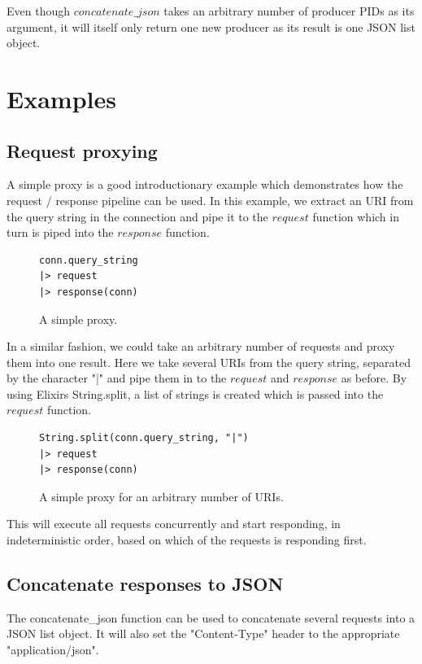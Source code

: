\documentclass{cslthse-msc}
\begin{document}
Even though $concatenate\_json$ takes an arbitrary number of producer PIDs as its argument, it will itself only return one new producer as its result is one JSON list object.


\section{Examples}
\subsection{Request proxying}
A simple proxy is a good introductionary example which demonstrates how the request / response pipeline can be used. In this example, we extract an URI from the query string in the connection and pipe it to the $request$ function which in turn is piped into the $response$ function.

\begin{figure}[H]
  \centering
\begin{lstlisting}[breaklines=true,frame=single]
conn.query_string
|> request
|> response(conn)
\end{lstlisting}
  \caption{A simple proxy.}
\end{figure}

In a similar fashion, we could take an arbitrary number of requests and proxy them into one result. Here we take several URIs from the query string, separated by the character "|" and pipe them in to the $request$ and $response$ as before. By using Elixirs String.split, a list of strings is created which is passed into the $request$ function.

\begin{figure}[H]
  \centering
\begin{lstlisting}[breaklines=true,frame=single]
String.split(conn.query_string, "|")
|> request
|> response(conn)
\end{lstlisting}
  \caption{A simple proxy for an arbitrary number of URIs.}
\end{figure}

This will execute all requests concurrently and start responding, in indeterministic order, based on which of the requests is responding first.

\subsection{Concatenate responses to JSON}
The concatenate\_json function can be used to concatenate several requests into a JSON list object. It will also set the "Content-Type" header to the appropriate "application/json".
\end{document}
